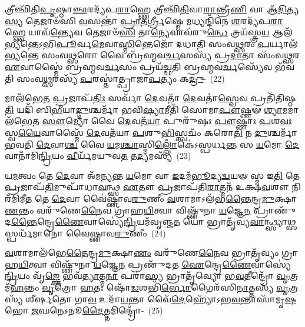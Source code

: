 𑌤𑍍𑌰𑍀𑌞𑍍𑌛𑌿᳴𑌤𑌿\-\ul{𑌪𑍃}\-𑌷𑍍𑌠𑌾\-\ul{𑌞𑍍𑌛}\-𑌰𑌦𑍍𑌯᳴𑌪\-\ul{𑌰𑌾}\-𑌹𑍍𑌣𑍇 𑌤𑍍𑌰𑍀𑌞𑍍𑌛𑌿᳴\-\ul{𑌤𑌿}\-𑌵𑌾\-\ul{𑌰𑌾}\-𑌨𑍍𑌤𑍍𑌰𑍀\-\ul{𑌣𑌿} 𑌵𑌾 𑌆᳴\-\ul{𑌦𑌿}\-𑌤𑍍𑌯\-\ul{𑌸𑍍𑌯} 𑌤𑍇𑌜𑌾𑍞᳴𑌸𑌿 \ul{𑌵}\-𑌸𑌨𑍍𑌤𑌾॑ \ul{𑌪𑍍𑌰𑌾}\-𑌤\-\ul{𑌰𑍍𑌗𑍍𑌰𑍀}\-𑌷𑍍𑌮𑍇 \ul{𑌮}\-𑌧𑍍𑌯𑌨𑍍𑌦𑌿᳴𑌨𑍇 \ul{𑌶}\-𑌰𑌦𑍍𑌯᳴𑌪\-\ul{𑌰𑌾}\-𑌹𑍍𑌣𑍇 𑌯𑌾𑌵᳴\-\ul{𑌨𑍍𑌤𑍍𑌯𑍇}\-𑌵 𑌤𑍇𑌜𑌾𑍞᳴\-\ul{𑌸𑌿} 𑌤𑌾\-\ul{𑌨𑍍𑌯𑍇}\-𑌵𑌾𑌵᳴\-𑌰𑍁\-\ul{𑌨𑍍𑌧𑍇} 𑌤𑍍𑌰𑌯᳴𑌸𑍍𑌤𑍍𑌰\-\ul{𑌯} 𑌆𑌲᳴𑌭𑍍𑌯𑌨𑍍𑌤𑍇\-𑌽𑌭𑌿\-\ul{𑌪𑍂}\-𑌰𑍍𑌵\-\ul{𑌮𑍇}\-𑌵𑌾\-\ul{𑌸𑍍𑌮𑌿}\-𑌨𑍍𑌤𑍇𑌜𑍋᳴ 𑌦𑌧𑌾𑌤𑌿 𑌸𑌂𑌵\-\ul{𑌥𑍍𑌸}\-𑌰𑌂 \ul{𑌪}\-𑌰𑍍𑌯𑌾𑌲᳴𑌭𑍍𑌯𑌨𑍍𑌤𑍇 𑌸𑌂𑌵\-\ul{𑌥𑍍𑌸}\-𑌰𑍋 𑌵𑍈 𑌬𑍍𑌰᳴𑌹𑍍𑌮𑌵\-\ul{𑌰𑍍𑌚}\-𑌸𑌸𑍍𑌯᳴ 𑌪𑍍𑌰\-\ul{𑌦𑌾}\-𑌤𑌾 𑌸𑌂᳴𑌵\-\ul{𑌥𑍍𑌸}\-𑌰 \ul{𑌏}\-𑌵𑌾𑌸𑍍𑌮𑍈॑ 𑌬𑍍𑌰𑌹𑍍𑌮𑌵\-\ul{𑌰𑍍𑌚}\-𑌸𑌂 𑌪𑍍𑌰𑌯᳴𑌚𑍍𑌛𑌤𑌿 𑌬𑍍𑌰𑌹𑍍𑌮𑌵\-\ul{𑌰𑍍𑌚}\-𑌸𑍍𑌯𑍇᳴𑌵 𑌭᳴𑌵𑌤𑌿 𑌸𑌂𑌵\-\ul{𑌥𑍍𑌸}\-𑌰𑌸𑍍𑌯᳴ \ul{𑌪}\-𑌰𑌸𑍍𑌤𑌾॑𑌤𑍍𑌪𑍍𑌰𑌾𑌜𑌾\-\ul{𑌪}\-𑌤𑍍𑌯𑌂 𑌕\-\ul{𑌦𑍍𑌰𑍁}\--~(22)

𑌮𑌾𑌲᳴𑌭𑍇𑌤 \ul{𑌪𑍍𑌰}\-𑌜𑌾𑌪᳴\-\ul{𑌤𑌿𑌃} 𑌸𑌰𑍍𑌵𑌾᳴ \ul{𑌦𑍇}\-𑌵𑌤𑌾᳴ \ul{𑌦𑍇}\-𑌵𑌤𑌾॑\-\ul{𑌸𑍍𑌵𑍇}\-𑌵 𑌪𑍍𑌰𑌤𑌿᳴𑌤𑌿𑌷𑍍𑌠\-\ul{𑌤𑌿} 𑌯𑌦𑌿᳴ 𑌬𑌿\-\ul{𑌭𑍀}\-𑌯𑌾\-\ul{𑌦𑍍𑌦𑍁}\-𑌶𑍍𑌚𑌰𑍍𑌮𑌾᳴ 𑌭𑌵𑌿\-\ul{𑌷𑍍𑌯𑌾}\-𑌮𑍀𑌤𑌿᳴ 𑌸𑍋𑌮𑌾\-\ul{𑌪𑍗}\-𑌷𑍍𑌣𑍟 \ul{𑌶𑍍𑌯𑌾}\-𑌮𑌮𑌾𑌲᳴𑌭𑍇𑌤 \ul{𑌸𑍗}\-𑌮𑍍𑌯𑍋 𑌵𑍈 \ul{𑌦𑍇}\-𑌵𑌤᳴\-\ul{𑌯𑌾} 𑌪𑍁𑌰𑍁᳴𑌷𑌃 \ul{𑌪𑍗}\-𑌷𑍍𑌣𑌾𑌃 \ul{𑌪}\-𑌶\-\ul{𑌵𑌃} 𑌸𑍍𑌵\-\ul{𑌯𑍈}\-𑌵𑌾𑌸𑍍𑌮𑍈᳴ \ul{𑌦𑍇}\-𑌵𑌤᳴𑌯𑌾 \ul{𑌪}\-𑌶𑍁\-\ul{𑌭𑌿}\-𑌸𑍍𑌤𑍍𑌵𑌚𑌂᳴ 𑌕𑌰𑍋\-\ul{𑌤𑌿} 𑌨 \ul{𑌦𑍁}\-𑌶𑍍𑌚𑌰𑍍𑌮𑌾᳴ 𑌭𑌵𑌤𑌿 \ul{𑌦𑍇}\-𑌵𑌾\-\ul{𑌶𑍍𑌚} 𑌵𑍈 \ul{𑌯}\-𑌮\-\ul{𑌶𑍍𑌚𑌾}\-𑌸𑍍𑌮𑌿\-\ul{𑌲𑍍𑌲𑍋𑌁}\-𑌕𑍇॑\-𑌽𑌸𑍍𑌪𑌰𑍍𑌧\-\ul{𑌨𑍍𑌤} 𑌸 \ul{𑌯}\-𑌮𑍋 \ul{𑌦𑍇}\-𑌵𑌾𑌨𑌾᳴𑌮𑌿\-\ul{𑌨𑍍𑌦𑍍𑌰𑌿}\-𑌯𑌂 \ul{𑌵𑍀}\-𑌰𑍍𑌯᳴𑌮𑌯𑍁𑌵\-\ul{𑌤} 𑌤\-\ul{𑌦𑍍𑌯}\-𑌮𑌸𑍍𑌯᳴~(23)

𑌯\-\ul{𑌮}\-𑌤𑍍𑌵𑌂 𑌤𑍇 \ul{𑌦𑍇}\-𑌵𑌾 𑌅᳴𑌮𑌨𑍍𑌯𑌨𑍍𑌤 \ul{𑌯}\-𑌮𑍋 𑌵𑌾 \ul{𑌇}\-𑌦𑌮᳴\-\ul{𑌭𑍂}\-𑌦𑍍𑌯\-\ul{𑌦𑍍𑌵}\-𑌯𑍟 𑌸𑍍𑌮 𑌇\-\ul{𑌤𑌿} 𑌤𑍇 \ul{𑌪𑍍𑌰}\-𑌜𑌾𑌪᳴\-\ul{𑌤𑌿}\-𑌮𑍁𑌪𑌾᳴𑌧𑌾\-\ul{𑌵}\-𑌨𑍍𑌥𑍍𑌸 \ul{𑌏}\-𑌤𑍗 \ul{𑌪𑍍𑌰}\-𑌜𑌾𑌪᳴𑌤𑌿\-\ul{𑌰𑌾}\-𑌤𑍍𑌮𑌨᳴ 𑌉𑌕𑍍𑌷\-\ul{𑌵}\-𑌶𑍗 𑌨𑌿𑌰᳴𑌮𑌿𑌮𑍀\-\ul{𑌤} 𑌤𑍇 \ul{𑌦𑍇}\-𑌵𑌾 𑌵𑍈॑𑌷𑍍𑌣𑌾𑌵\-\ul{𑌰𑍁}\-𑌣𑍀𑌂 \ul{𑌵}\-𑌶𑌾𑌮𑌾\-𑌽𑌲᳴𑌭\-\ul{𑌨𑍍𑌤𑍈}\-𑌨𑍍𑌦𑍍𑌰\-\ul{𑌮𑍁}\-𑌕𑍍𑌷𑌾\-\ul{𑌣}\-𑌨𑍍𑌤𑌂 𑌵𑌰𑍁᳴𑌣𑍇\-\ul{𑌨𑍈}\-𑌵 𑌗𑍍𑌰𑌾᳴𑌹\-\ul{𑌯𑌿}\-𑌤𑍍𑌵𑌾 𑌵𑌿𑌷𑍍𑌣𑍁᳴𑌨𑌾 \ul{𑌯}\-𑌜𑍍𑌞𑍇\-\ul{𑌨} 𑌪𑍍𑌰𑌾𑌣𑍁᳴𑌦\-\ul{𑌨𑍍𑌤𑍈}\-𑌨𑍍𑌦𑍍𑌰𑍇\-\ul{𑌣𑍈}\-𑌵𑌾𑌸𑍍𑌯𑍇॑\-\ul{𑌨𑍍𑌦𑍍𑌰𑌿}\-𑌯𑌮᳴𑌵𑍃𑌞𑍍𑌜\-\ul{𑌤} 𑌯𑍋 𑌭𑍍𑌰𑌾𑌤𑍃᳴𑌵𑍍𑌯\-\ul{𑌵𑌾}\-𑌨𑍍𑌥𑍍𑌸𑍍𑌯𑌾𑌥𑍍𑌸 𑌸𑍍𑌪𑌰𑍍𑌧᳴𑌮𑌾𑌨𑍋 𑌵𑍈𑌷𑍍𑌣𑌾𑌵\-\ul{𑌰𑍁}\-𑌣𑍀𑌂~(24)

\-\ul{𑌵}\-𑌶𑌾𑌮𑌾𑌲᳴𑌭𑍇\-\ul{𑌤𑍈}\-𑌨𑍍𑌦𑍍𑌰\-\ul{𑌮𑍁}\-𑌕𑍍𑌷𑌾\-\ul{𑌣𑌂} 𑌵𑌰𑍁᳴𑌣𑍇\-\ul{𑌨𑍈}\-𑌵 𑌭𑍍𑌰𑌾𑌤𑍃᳴𑌵𑍍𑌯𑌂 𑌗𑍍𑌰𑌾𑌹\-\ul{𑌯𑌿}\-𑌤𑍍𑌵𑌾 𑌵𑌿𑌷𑍍𑌣𑍁᳴𑌨𑌾 \ul{𑌯}\-𑌜𑍍𑌞𑍇\-\ul{𑌨} 𑌪𑍍𑌰𑌣𑍁᳴𑌦𑌤 \ul{𑌐}\-𑌨𑍍𑌦𑍍𑌰𑍇\-\ul{𑌣𑍈}\-𑌵𑌾𑌸𑍍𑌯𑍇॑\-\ul{𑌨𑍍𑌦𑍍𑌰𑌿}\-𑌯𑌂 𑌵𑍃᳴\-\ul{𑌙𑍍𑌕𑍍𑌤𑍇} 𑌭𑌵᳴\-\ul{𑌤𑍍𑌯𑌾}\-𑌤𑍍𑌮\-\ul{𑌨𑌾} 𑌪𑌰𑌾॑\-\ul{𑌸𑍍𑌯} 𑌭𑍍𑌰𑌾𑌤𑍃᳴𑌵𑍍𑌯𑍋 𑌭\-\ul{𑌵}\-𑌤𑍀𑌨𑍍𑌦𑍍𑌰𑍋᳴ \ul{𑌵𑍃}\-𑌤𑍍𑌰𑌮᳴\-\ul{𑌹}\-𑌨𑍍𑌤𑌂 \ul{𑌵𑍃}\-𑌤𑍍𑌰𑍋 \ul{𑌹}\-𑌤𑌃 𑌷𑍋᳴\-\ul{𑌡}\-𑌶𑌭𑌿᳴\-\ul{𑌰𑍍𑌭𑍋}\-𑌗𑍈𑌰᳴𑌸𑌿\-\ul{𑌨𑌾}\-𑌤𑍍𑌤𑌸𑍍𑌯᳴ \ul{𑌵𑍃}\-𑌤𑍍𑌰𑌸𑍍𑌯᳴ 𑌶𑍀𑌰𑍍\mbox{}\-\ul{𑌷}\-𑌤𑍋 𑌗𑌾\-\ul{𑌵} 𑌉𑌦𑌾᳴\-\ul{𑌯}\-𑌨𑍍𑌤𑌾 𑌵𑍈᳴\-\ul{𑌦𑍇}\-𑌹𑍍𑌯𑍋᳴\-𑌽𑌭\-\ul{𑌵}\-𑌨𑍍𑌤𑌾𑌸𑌾᳴𑌮𑍃\-\ul{𑌷}\-𑌭𑍋 \ul{𑌜}\-𑌘𑌨𑍇\-𑌽𑌨𑍂\-\ul{𑌦𑍈}\-𑌤𑍍𑌤𑌮𑌿𑌨𑍍𑌦𑍍𑌰𑍋᳴-~(25)

